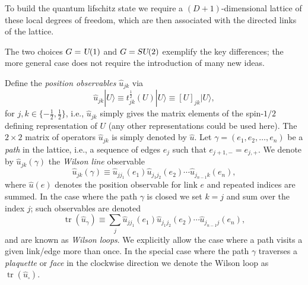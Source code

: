 \documentclass[twocolumn,lengthcheck,superscriptaddress]{revtex4-1}
\newcommand{\tr}{\operatorname{tr}}
\def\su2{\textsl{SU}(2)}
\def\uone{\textsl{U}(1)}
\theoremstyle{definition}
\theoremstyle{remark}
\begin{document}
To build the quantum lifschitz state we require a $(D+1)$-dimensional lattice of these local degrees of freedom, which are then associated with the directed links of the lattice.

The two choices $G=\uone$ and $G=\su2$ exemplify the key differences; the more general case does not require the introduction of many new ideas. 

Define the \emph{position observables} $\widehat{u}_{jk}$ via
\begin{equation}
	\widehat{u}_{jk}|U\rangle \equiv t_{jk}^{\frac12}(U)|U\rangle \equiv [U]_{jk}|U\rangle,
\end{equation} 
for $j,k \in \{-\frac12, \frac12\}$, i.e., $\widehat{u}_{jk}$ simply gives the matrix elements of the spin-$1/2$ defining representation of $U$ (any other representations could be used here). The $2\times 2$ matrix of operators $\widehat{u}_{jk}$ is simply denoted by $\widehat{u}$. Let $\gamma = (e_1,e_2,\ldots,e_n)$ be a \emph{path} in the lattice, i.e., a sequence of edges $e_j$ such that $e_{j+1,-} = e_{j,+}$. We denote by $\widehat{u}_{jk}(\gamma)$ the \emph{Wilson line} observable
\begin{equation}
	\widehat{u}_{jk}(\gamma) \equiv \widehat{u}_{j j_1}(e_1)\widehat{u}_{j_1j_2}(e_2)\cdots \widehat{u}_{j_{n-1} k}(e_n),
\end{equation}
where $\widehat{u}(e)$ denotes the position observable for link $e$ and repeated indices are summed. In the case where the path $\gamma$ is closed we set $k=j$ and sum over the index $j$; such observables are denoted 
\begin{equation}
	\tr(\widehat{u}_{\gamma}) \equiv \sum_{j}\widehat{u}_{j j_1}(e_1)\widehat{u}_{j_1j_2}(e_2)\cdots \widehat{u}_{j_{n-1} j}(e_n),
\end{equation}
and are known as \emph{Wilson loops}. We explicitly allow the case where a path visits a given link/edge more than once. In the special case where the path $\gamma$ traverses a \emph{plaquette} or \emph{face} in the clockwise direction we denote the Wilson loop as $\tr(\widehat{u}_{\square})$.
\end{document}
